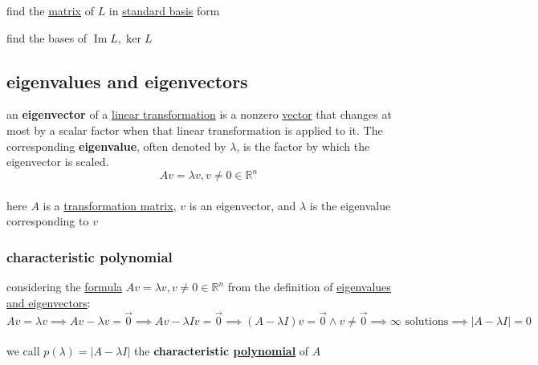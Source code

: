 \documentclass[a4paper,12pt]{article}
\DeclareMathOperator{\img}{Im}
\begin{document}
\begin{definition}
\begin{question}
\begin{subquestion}
find the \hyperref[sec:org2833a15]{matrix} of \(L\) in \hyperref[sec:orgf759dd0]{standard basis} form\\
\end{subquestion}

\begin{subquestion}
find the bases of \(\img L, \ker L\)\\
\end{subquestion}
\end{question}
\end{definition}
\subsection{eigenvalues and eigenvectors}
\label{sec:org929d22f}
\begin{definition}
an \textbf{eigenvector} of a \hyperref[sec:orgdf3d063]{linear transformation} is a nonzero \hyperref[sec:org103a65e]{vector} that changes at most by a scalar factor when that linear transformation is applied to it. The corresponding \textbf{eigenvalue}, often denoted by \(\lambda\), is the factor by which the eigenvector is scaled.\\
\[
  Av = \lambda v, v \neq 0 \in \mathbb{R}^n
\]\\
here \(A\) is a \hyperref[sec:orgda83b79]{transformation matrix}, \(v\) is an eigenvector, and \(\lambda\) is the eigenvalue corresponding to \(v\)\\
\end{definition}
\subsubsection{characteristic polynomial}
\label{sec:orgb773cc6}
\begin{definition}
considering the \href{20220711175314-formula.org}{formula} \(Av = \lambda v, v \neq 0 \in \mathbb{R}^n\) from the definition of \hyperref[sec:org929d22f]{eigenvalues and eigenvectors}:\\
\[
  Av = \lambda v \implies Av - \lambda v = \vec0 \implies Av - \lambda I v = \vec0 \implies (A-\lambda I)v = \vec0 \land v \neq \vec0 \implies \infty \text{ solutions} \implies |A - \lambda I| = 0
\]\\
we call \(p(\lambda) = |A - \lambda I|\) the \textbf{characteristic \href{calculus2.org}{polynomial}} of \(A\)\\
\end{definition}
\end{document}
